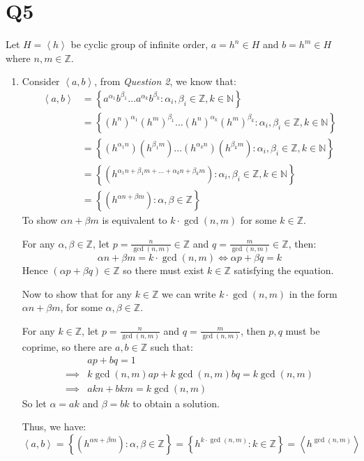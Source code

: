 \documentclass[a4paper, 11pt]{article}
\newcommand{\NN}{\mathbb{N}}
\newcommand{\ZZ}{\mathbb{Z}}
\def\set#1{\left\{ #1 \right\}}
\def\gen#1{\left\langle#1 \right\rangle}
\begin{document}
\pagebreak
\section*{Q5}
Let $H=\gen{h}$ be cyclic group of infinite order, $a=h^n\in H$ and $b=h^m\in H$ where $n,m\in\ZZ$. 
\begin{enumerate}[label=(\alph*)]
	\item 
	Consider $\gen{a,b}$, from \textit{Question 2}, we know that:
	\begin{align*}
		\gen{a,b} &= \set{
			a^{\alpha_1}b^{\beta_1}\dots 
			a^{\alpha_k}b^{\beta_k} : \alpha_i,\beta_i\in\ZZ, k\in\NN
		}\\
		&= \set{
			(h^n)^{\alpha_1}(h^m)^{\beta_1}\dots 
			(h^n)^{\alpha_k}(h^m)^{\beta_k} : \alpha_i,\beta_i\in\ZZ, k\in\NN
		}\\
		&= \set{
			(h^{\alpha_1n})(h^{\beta_1m})\dots 
			(h^{\alpha_kn})(h^{\beta_km})
			: \alpha_i,\beta_i\in\ZZ, k\in\NN
		}\\
		&= \set{
			(h^{
				\alpha_1n + \beta_1m 
				+ \dots + 
				\alpha_kn+\beta_km
			})
			: \alpha_i,\beta_i\in\ZZ, k\in\NN
		}\\
		&= \set{
			(h^{
				\alpha n + \beta m 
			})
			: \alpha,\beta\in\ZZ
		}
	\end{align*}
	To show $\alpha n+\beta m$ is equivalent to $k\cdot\gcd(n,m)$ for some $k\in\ZZ$. 
	\begin{mdframed}
		For any $\alpha,\beta\in\ZZ$, let $p=\frac{n}{\gcd(n,m)}\in\ZZ$ and $q=\frac{m}{\gcd(n,m)}\in\ZZ$, then: 
		\[
			\alpha n + \beta m = k\cdot\gcd(n,m) \iff \alpha p + \beta q = k 
		\]
		Hence $(\alpha p + \beta q)\in\ZZ$ so there must exist $k\in\ZZ$ satisfying the equation. 

		Now to show that for any $k\in\ZZ$ we can write $k\cdot\gcd(n,m)$ in the form $\alpha n + \beta m$, for some $\alpha,\beta\in\ZZ$. 

		For any $k\in\ZZ$, let $p=\frac{n}{\gcd(n,m)}$ and $q=\frac{m}{\gcd(n,m)}$, then $p,q$ must be coprime, so there are $a,b\in\ZZ$ such that: 
		\begin{align*}
					& ap+bq=1 \\ 
		\implies 	& k\gcd(n,m)ap + k\gcd(n,m) bq = k\gcd(n,m)\\  
		\implies 	& akn + bkm = k\gcd(n,m)  
		\end{align*}
		So let $\alpha = ak$ and $\beta = bk$ to obtain a solution. 
	\end{mdframed}
	Thus, we have:  
	\[
		\gen{a,b}=
		\set{
			(h^{
				\alpha n + \beta m 
			})
			: \alpha,\beta\in\ZZ
		} = \set { 
			h^{k\cdot\gcd(n,m)} : k \in\ZZ 
		} = \gen{h^{\gcd(n,m)}}
	\]


\end{enumerate}
\end{document}
